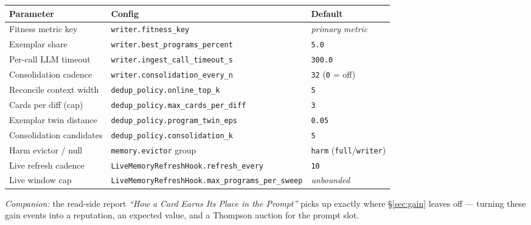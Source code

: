 \documentclass[11pt]{article}
\newcommand{\code}[1]{\texttt{\small #1}}
\begin{document}
\begin{longtable}{@{}p{}p{}p{}@{}}
\toprule
\textbf{Parameter} & \textbf{Config} & \textbf{Default} \\
\midrule
\endhead
Fitness metric key & \code{writer.fitness\_key} & \emph{primary metric} \\
Exemplar share & \code{writer.best\_programs\_percent} & \code{5.0} \\
Per-call LLM timeout & \code{writer.ingest\_call\_timeout\_s} & \code{300.0} \\
Consolidation cadence & \code{writer.consolidation\_every\_n} & \code{32} (\code{0} = off) \\
Reconcile context width & \code{dedup\_policy.online\_top\_k} & \code{5} \\
Cards per diff (cap) & \code{dedup\_policy.max\_cards\_per\_diff} & \code{3} \\
Exemplar twin distance & \code{dedup\_policy.program\_twin\_eps} & \code{0.05} \\
Consolidation candidates & \code{dedup\_policy.consolidation\_k} & \code{5} \\
Harm evictor / null & \code{memory.evictor} group & \code{harm} (\code{full}/\code{writer}) \\
Live refresh cadence & \code{LiveMemoryRefreshHook.refresh\_every} & \code{10} \\
Live window cap & \code{LiveMemoryRefreshHook.max\_programs\_per\_sweep} & \emph{unbounded} \\
\bottomrule
\end{longtable}

\vspace{1em}
\noindent\emph{Companion:} the read-side report \emph{``How a Card Earns Its
Place in the Prompt''} picks up exactly where \S\ref{sec:gain} leaves off ---
turning these gain events into a reputation, an expected value, and a Thompson
auction for the prompt slot.
\end{document}
